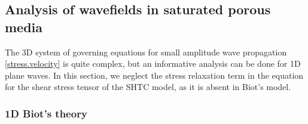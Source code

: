 \documentclass[3p,times,table]{article}
\begin{document}
\subsection{Analysis of wavefields in saturated porous 
 	media}\label{sec.waves}
 
The 3D system of governing equations for small amplitude wave propagation  
\eqref{stress.velocity} is quite complex, but an informative analysis can be 
done for 1D plane waves. In this section, we neglect the stress 
relaxation term in the equation for the shear stress tensor of the SHTC model, as it 
is absent in  
Biot's model.

%


  

\subsubsection{1D Biot's theory}
\end{document}
